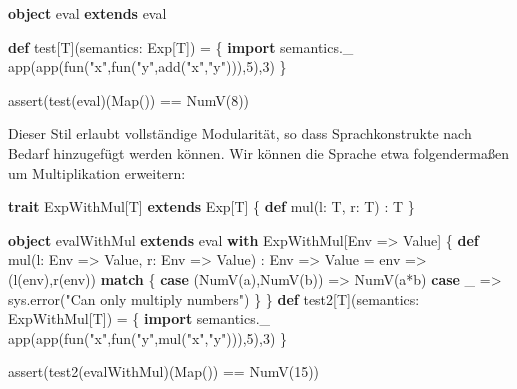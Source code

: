\documentclass[]{article}
\newenvironment{Shaded}{}{}
\newcommand{\DecValTok}[1]{\textcolor[rgb]{0.25,0.63,0.44}{#1}}
\newcommand{\FunctionTok}[1]{\textcolor[rgb]{0.02,0.16,0.49}{#1}}
\newcommand{\KeywordTok}[1]{\textcolor[rgb]{0.00,0.44,0.13}{\textbf{#1}}}
\newcommand{\NormalTok}[1]{#1}
\newcommand{\StringTok}[1]{\textcolor[rgb]{0.25,0.44,0.63}{#1}}
\begin{document}
\begin{Shaded}
\begin{Highlighting}[]
\KeywordTok{object}\NormalTok{ eval }\KeywordTok{extends}\NormalTok{ eval}

\KeywordTok{def}\NormalTok{ test[T](semantics: Exp[T]) = \{}
  \KeywordTok{import}\NormalTok{ semantics.}\FunctionTok{\_}
  \FunctionTok{app}\NormalTok{(}\FunctionTok{app}\NormalTok{(}\FunctionTok{fun}\NormalTok{(}\StringTok{"x"}\NormalTok{,}\FunctionTok{fun}\NormalTok{(}\StringTok{"y"}\NormalTok{,}\FunctionTok{add}\NormalTok{(}\StringTok{"x"}\NormalTok{,}\StringTok{"y"}\NormalTok{))),}\DecValTok{5}\NormalTok{),}\DecValTok{3}\NormalTok{)}
\NormalTok{\}}

\FunctionTok{assert}\NormalTok{(}\FunctionTok{test}\NormalTok{(eval)(Map()) == }\FunctionTok{NumV}\NormalTok{(}\DecValTok{8}\NormalTok{))}
\end{Highlighting}
\end{Shaded}

Dieser Stil erlaubt vollständige Modularität, so dass Sprachkonstrukte
nach Bedarf hinzugefügt werden können. Wir können die Sprache etwa
folgendermaßen um Multiplikation erweitern:

\begin{Shaded}
\begin{Highlighting}[]
\KeywordTok{trait}\NormalTok{ ExpWithMul[T] }\KeywordTok{extends}\NormalTok{ Exp[T] \{}
  \KeywordTok{def} \FunctionTok{mul}\NormalTok{(l: T, r: T) : T}
\NormalTok{\}}

\KeywordTok{object}\NormalTok{ evalWithMul }\KeywordTok{extends}\NormalTok{ eval }\KeywordTok{with}\NormalTok{ ExpWithMul[Env =\textgreater{} Value] \{}
  \KeywordTok{def} \FunctionTok{mul}\NormalTok{(l: Env =\textgreater{} Value, r: Env =\textgreater{} Value) : Env =\textgreater{} Value =}
\NormalTok{    env =\textgreater{} (}\FunctionTok{l}\NormalTok{(env),}\FunctionTok{r}\NormalTok{(env)) }\KeywordTok{match}\NormalTok{ \{}
      \KeywordTok{case}\NormalTok{ (}\FunctionTok{NumV}\NormalTok{(a),}\FunctionTok{NumV}\NormalTok{(b)) =\textgreater{} }\FunctionTok{NumV}\NormalTok{(a*b)}
      \KeywordTok{case}\NormalTok{ \_ =\textgreater{} sys.}\FunctionTok{error}\NormalTok{(}\StringTok{"Can only multiply numbers"}\NormalTok{)}
\NormalTok{    \}}
\NormalTok{\}}
\KeywordTok{def}\NormalTok{ test2[T](semantics: ExpWithMul[T]) = \{}
  \KeywordTok{import}\NormalTok{ semantics.}\FunctionTok{\_}
  \FunctionTok{app}\NormalTok{(}\FunctionTok{app}\NormalTok{(}\FunctionTok{fun}\NormalTok{(}\StringTok{"x"}\NormalTok{,}\FunctionTok{fun}\NormalTok{(}\StringTok{"y"}\NormalTok{,}\FunctionTok{mul}\NormalTok{(}\StringTok{"x"}\NormalTok{,}\StringTok{"y"}\NormalTok{))),}\DecValTok{5}\NormalTok{),}\DecValTok{3}\NormalTok{)}
\NormalTok{\}}

\FunctionTok{assert}\NormalTok{(}\FunctionTok{test2}\NormalTok{(evalWithMul)(Map()) == }\FunctionTok{NumV}\NormalTok{(}\DecValTok{15}\NormalTok{))}
\end{Highlighting}
\end{Shaded}
\end{document}
